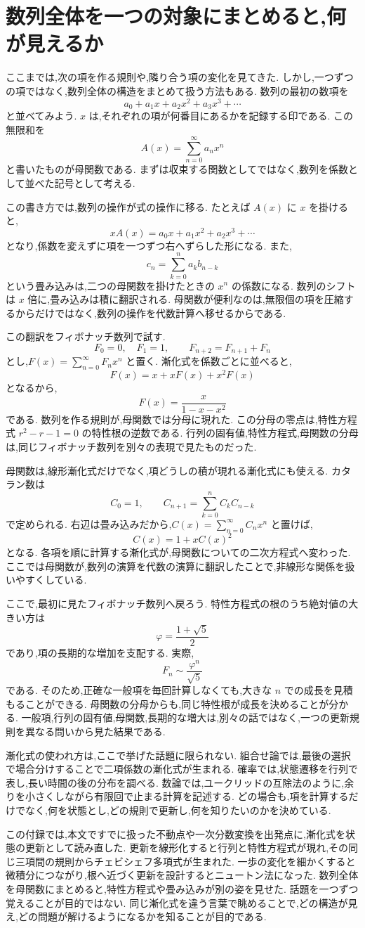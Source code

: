\section{数列全体を一つの対象にまとめると,何が見えるか}

ここまでは,次の項を作る規則や,隣り合う項の変化を見てきた.
しかし,一つずつの項ではなく,数列全体の構造をまとめて扱う方法もある.
数列の最初の数項を
\[
  a_0+a_1x+a_2x^2+a_3x^3+\cdots
\]
と並べてみよう.
$x$ は,それぞれの項が何番目にあるかを記録する印である.
この無限和を
\[
  A(x)=\sum_{n=0}^{\infty}a_nx^n
\]
と書いたものが母関数である.
まずは収束する関数としてではなく,数列を係数として並べた記号として考える.

この書き方では,数列の操作が式の操作に移る.
たとえば $A(x)$ に $x$ を掛けると,
\[
  xA(x)=a_0x+a_1x^2+a_2x^3+\cdots
\]
となり,係数を変えずに項を一つずつ右へずらした形になる.
また,
\[
  c_n=\sum_{k=0}^{n}a_kb_{n-k}
\]
という畳み込みは,二つの母関数を掛けたときの $x^n$ の係数になる.
数列のシフトは $x$ 倍に,畳み込みは積に翻訳される.
母関数が便利なのは,無限個の項を圧縮するからだけではなく,数列の操作を代数計算へ移せるからである.

この翻訳をフィボナッチ数列で試す.
\[
  F_0=0,\quad F_1=1,\qquad F_{n+2}=F_{n+1}+F_n
\]
とし,$F(x)=\sum_{n=0}^{\infty}F_nx^n$ と置く.
漸化式を係数ごとに並べると,
\[
  F(x)=x+xF(x)+x^2F(x)
\]
となるから,
\[
  F(x)=\frac{x}{1-x-x^2}
\]
である.
数列を作る規則が,母関数では分母に現れた.
この分母の零点は,特性方程式 $r^2-r-1=0$ の特性根の逆数である.
行列の固有値,特性方程式,母関数の分母は,同じフィボナッチ数列を別々の表現で見たものだった.

母関数は,線形漸化式だけでなく,項どうしの積が現れる漸化式にも使える.
カタラン数は
\[
  C_0=1,\qquad C_{n+1}=\sum_{k=0}^{n}C_kC_{n-k}
\]
で定められる.
右辺は畳み込みだから,$C(x)=\sum_{n=0}^{\infty}C_nx^n$ と置けば,
\[
  C(x)=1+xC(x)^2
\]
となる.
各項を順に計算する漸化式が,母関数についての二次方程式へ変わった.
ここでは母関数が,数列の演算を代数の演算に翻訳したことで,非線形な関係を扱いやすくしている.

ここで,最初に見たフィボナッチ数列へ戻ろう.
特性方程式の根のうち絶対値の大きい方は
\[
  \varphi=\frac{1+\sqrt5}{2}
\]
であり,項の長期的な増加を支配する.
実際,
\[
  F_n\sim\frac{\varphi^n}{\sqrt5}
\]
である.
そのため,正確な一般項を毎回計算しなくても,大きな $n$ での成長を見積もることができる.
母関数の分母からも,同じ特性根が成長を決めることが分かる.
一般項,行列の固有値,母関数,長期的な増大は,別々の話ではなく,一つの更新規則を異なる問いから見た結果である.

漸化式の使われ方は,ここで挙げた話題に限られない.
組合せ論では,最後の選択で場合分けすることで二項係数の漸化式が生まれる.
確率では,状態遷移を行列で表し,長い時間の後の分布を調べる.
数論では,ユークリッドの互除法のように,余りを小さくしながら有限回で止まる計算を記述する.
どの場合も,項を計算するだけでなく,何を状態とし,どの規則で更新し,何を知りたいのかを決めている.

この付録では,本文ですでに扱った不動点や一次分数変換を出発点に,漸化式を状態の更新として読み直した.
更新を線形化すると行列と特性方程式が現れ,その同じ三項間の規則からチェビシェフ多項式が生まれた.
一歩の変化を細かくすると微積分につながり,根へ近づく更新を設計するとニュートン法になった.
数列全体を母関数にまとめると,特性方程式や畳み込みが別の姿を見せた.
話題を一つずつ覚えることが目的ではない.
同じ漸化式を違う言葉で眺めることで,どの構造が見え,どの問題が解けるようになるかを知ることが目的である.
